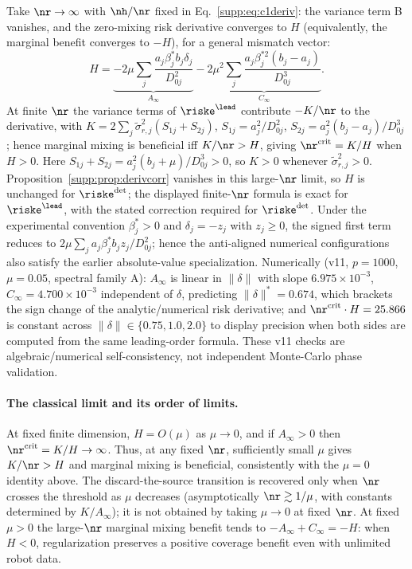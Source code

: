 Take $\nr \to \infty$ with $\nh/\nr$ fixed in Eq.~\eqref{supp:eq:c1deriv}: the variance term B vanishes, and the zero-mixing risk derivative converges to $H$ (equivalently, the marginal benefit converges to $-H$), for a general mismatch vector:
\begin{equation}
  H = \underbrace{-2\mu \sum_j \frac{a_j\beta^*_j b_j \delta_j}{D_{0j}^2}}_{A_\infty} - \underbrace{2\mu^2 \sum_j \frac{a_j\beta_j^{*2}(b_j - a_j)}{D_{0j}^3}}_{C_\infty}.
  \label{supp:eq:h}
\end{equation}
At finite $\nr$ the variance terms of $\riske^{\lead}$ contribute $-K/\nr$ to the derivative, with $K = 2\sum_j\tilde\sigma_{r,j}^2(S_{1j} + S_{2j})$, $S_{1j} = a_j^2/D_{0j}^2$, $S_{2j} = a_j^2(b_j-a_j)/D_{0j}^3$; hence marginal mixing is beneficial iff $K/\nr > H$, giving $\nr^{\mathrm{crit}} = K/H$ when $H > 0$. Here $S_{1j}+S_{2j}=a_j^2(b_j+\mu)/D_{0j}^3>0$, so $K>0$ whenever $\tilde\sigma_{r,j}^2>0$.
Proposition~\ref{supp:prop:derivcorr} vanishes in this large-$\nr$ limit, so $H$ is unchanged for $\riske^{\det}$; the displayed finite-$\nr$ formula is exact for $\riske^{\lead}$, with the stated correction required for $\riske^{\det}$.
Under the experimental convention $\beta_j^*>0$ and $\delta_j=-z_j$ with $z_j\ge0$, the signed first term reduces to $2\mu\sum_j a_j\beta_j^*b_jz_j/D_{0j}^2$; hence the anti-aligned numerical configurations also satisfy the earlier absolute-value specialization.
Numerically (v11, $p = 1000$, $\mu = 0.05$, spectral family A): $A_\infty$ is linear in $\|\delta\|$ with slope $6.975\times10^{-3}$, $C_\infty = 4.700\times10^{-3}$ independent of $\delta$, predicting $\|\delta\|^* = 0.674$, which brackets the sign change of the analytic/numerical risk derivative; and $\nr^{\mathrm{crit}}\cdot H = 25.866$ is constant across $\|\delta\| \in \{0.75, 1.0, 2.0\}$ to display precision when both sides are computed from the same leading-order formula.
These v11 checks are algebraic/numerical self-consistency, not independent Monte-Carlo phase validation.

\paragraph{The classical limit and its order of limits.}
At fixed finite dimension, $H=O(\mu)$ as $\mu\to0$, and if $A_\infty>0$ then $\nr^{\mathrm{crit}}=K/H\to\infty$.
Thus, at any fixed $\nr$, sufficiently small $\mu$ gives $K/\nr>H$ and marginal mixing is beneficial, consistently with the $\mu=0$ identity above.
The discard-the-source transition is recovered only when $\nr$ crosses the threshold as $\mu$ decreases (asymptotically $\nr\gtrsim1/\mu$, with constants determined by $K/A_\infty$); it is not obtained by taking $\mu\to0$ at fixed $\nr$.
At fixed $\mu > 0$ the large-$\nr$ marginal mixing benefit tends to $-A_\infty+C_\infty=-H$: when $H<0$, regularization preserves a positive coverage benefit even with unlimited robot data.

